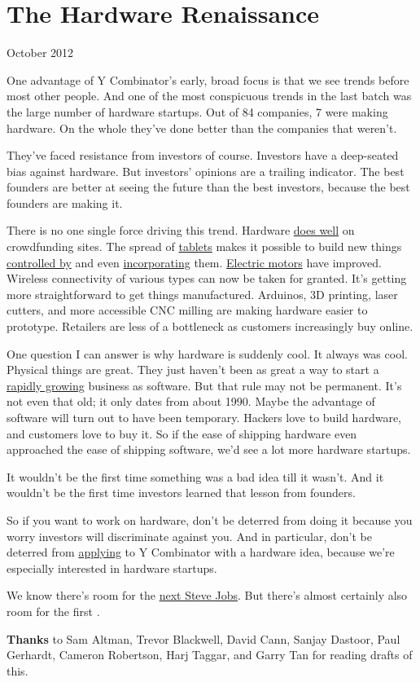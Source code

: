\chapter{The Hardware Renaissance}

October 2012

One advantage of Y Combinator's early, broad focus is that we see trends
before most other people. And one of the most conspicuous trends in the
last batch was the large number of hardware startups. Out of 84
companies, 7 were making hardware. On the whole they've done better than
the companies that weren't.

They've faced resistance from investors of course. Investors have a
deep-seated bias against hardware. But investors' opinions are a
trailing indicator. The best founders are better at seeing the future
than the best investors, because the best founders are making it.

There is no one single force driving this trend. Hardware
\href{http://bits.blogs.nytimes.com/2012/05/11/pebble-smartwatch-tops-out-at-10-million-on-kickstarter/}{does
well} on crowdfunding sites. The spread of
\href{http://paulgraham.com/tablets.html}{tablets} makes it possible to
build new things \href{http://lockitron.com}{controlled by} and even
\href{http://doublerobotics.com}{incorporating} them.
\href{http://www.boostedboards.com/}{Electric motors} have improved.
Wireless connectivity of various types can now be taken for granted.
It's getting more straightforward to get things manufactured. Arduinos,
3D printing, laser cutters, and more accessible CNC milling are making
hardware easier to prototype. Retailers are less of a bottleneck as
customers increasingly buy online.

One question I can answer is why hardware is suddenly cool. It always
was cool. Physical things are great. They just haven't been as great a
way to start a \href{growth.html}{rapidly growing} business as software.
But that rule may not be permanent. It's not even that old; it only
dates from about 1990. Maybe the advantage of software will turn out to
have been temporary. Hackers love to build hardware, and customers love
to buy it. So if the ease of shipping hardware even approached the ease
of shipping software, we'd see a lot more hardware startups.

It wouldn't be the first time something was a bad idea till it wasn't.
And it wouldn't be the first time investors learned that lesson from
founders.

So if you want to work on hardware, don't be deterred from doing it
because you worry investors will discriminate against you. And in
particular, don't be deterred from
\href{http://ycombinator.com/apply.html}{applying} to Y Combinator with
a hardware idea, because we're especially interested in hardware
startups.

We know there's room for the \href{ambitious.html}{next Steve Jobs}. But
there's almost certainly also room for the first .

\textbf{Thanks} to Sam Altman, Trevor Blackwell, David Cann, Sanjay
Dastoor, Paul Gerhardt, Cameron Robertson, Harj Taggar, and Garry Tan
for reading drafts of this.